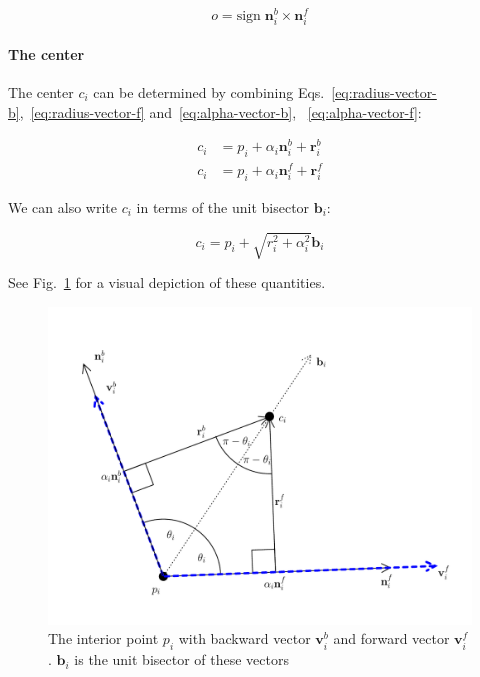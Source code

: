 \documentclass{article}
\begin{document}
\begin{equation}
  \label{eq:orientation}
  o = \mathrm{sign}\; \mathbf{n}^{b}_{i} \times \mathbf{n}^{f}_{i}
\end{equation}

\paragraph{The center}

The center $c_{i}$ can be determined by combining Eqs.~\eqref{eq:radius-vector-b},~\eqref{eq:radius-vector-f} and~\eqref{eq:alpha-vector-b}, ~\eqref{eq:alpha-vector-f}:

\begin{align}
  \label{eq:center-vector-b}
  c_{i} &= p_{i} + \alpha_i\mathbf{n}^b_i + \mathbf{r}^{b}_{i}\\
  \label{eq:center-vector-f}
  c_{i} &= p_{i} + \alpha_i\mathbf{n}^f_i + \mathbf{r}^{f}_{i}
\end{align}

We can also write $c_{i}$ in terms of the unit bisector $\mathbf{b}_{i}$:

\begin{equation}
  \label{eq:center-bisector}
  c_{i} = p_{i} + \sqrt{r_{i}^{2} + \alpha_{i}^{2}}\mathbf{b}_{i}
\end{equation}

See Fig.~\ref{fig:interior-point} for a visual depiction of these quantities.

\begin{figure}[h]
  \centering
  \includegraphics[width=\columnwidth]{4}
  \caption{The interior point $p_{i}$ with backward vector $\mathbf{v}^{b}_{i}$ and forward vector $\mathbf{v}^{f}_{i}$. $\mathbf{b}_{i}$ is the unit bisector of these vectors}
  \label{fig:interior-point}
\end{figure}
\end{document}
